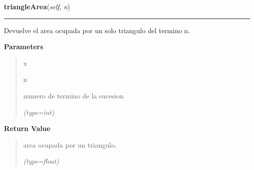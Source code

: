 \hspace{.8\funcindent}\begin{boxedminipage}{\funcwidth}

    \raggedright \textbf{triangleArea}(\textit{self}, \textit{n})

    \vspace{-1.5ex}

    \rule{\textwidth}{0.5\fboxrule}
\setlength{\parskip}{2ex}
    Devuelve el area ocupada por un solo triangulo del termino n.

\setlength{\parskip}{1ex}
      \textbf{Parameters}
      \vspace{-1ex}

      \begin{quote}
        \begin{Ventry}{x}

          \item[n]

          numero de termino de la sucesion

            {\it (type=int)}

        \end{Ventry}

      \end{quote}

      \textbf{Return Value}
    \vspace{-1ex}

      \begin{quote}
      area ocupada por un triangulo.

      {\it (type=float)}

      \end{quote}

    \end{boxedminipage}

    \label{FractalZE:sierpinsky:Sierpinsky:triangleHeight}

    \vspace{0.5ex}

